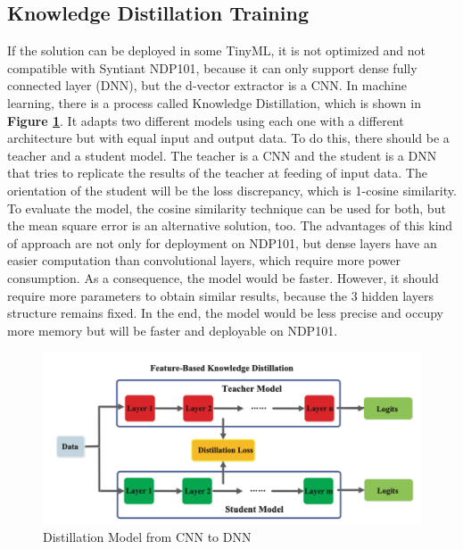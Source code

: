 \subsection{Knowledge Distillation Training}
\label{subsec:knowledge distillation training}
If the solution can be deployed in some TinyML, it is not optimized and not compatible with Syntiant NDP101, because it can only support dense fully connected layer (DNN), but the d-vector extractor is a CNN\cite{distillation_from_cnn_to_dnn}\cite{knowledge_distillation}. In machine learning, there is a process called Knowledge Distillation, which is shown in \textbf{Figure \ref{fig:distillation model}}. It adapts two different models using each one with a different architecture but with equal input and output data. To do this, there should be a teacher and a student model. The teacher is a CNN and the student is a DNN that tries to replicate the results of the teacher at feeding of input data. The orientation of the student will be the loss discrepancy, which is 1-cosine similarity. To evaluate the model, the cosine similarity technique can be used for both, but the mean square error is an alternative solution, too. The advantages of this kind of approach are not only for deployment on NDP101, but dense layers have an easier computation than convolutional layers, which require more power consumption. As a consequence, the model would be faster. However, it should require more parameters to obtain similar results, because the 3 hidden layers structure remains fixed. In the end, the model would be less precise and occupy more memory but will be faster and deployable on NDP101.
\begin{center}
\begin{figure}[!h]
        \centering
        \includegraphics[width=1.0\textwidth]{images/3.03 Distillation Technique.png}
        \caption{Distillation Model from CNN to DNN \cite{knowledge_distillation}}
        \label{fig:distillation model}
    \end{figure}
\end{center}
